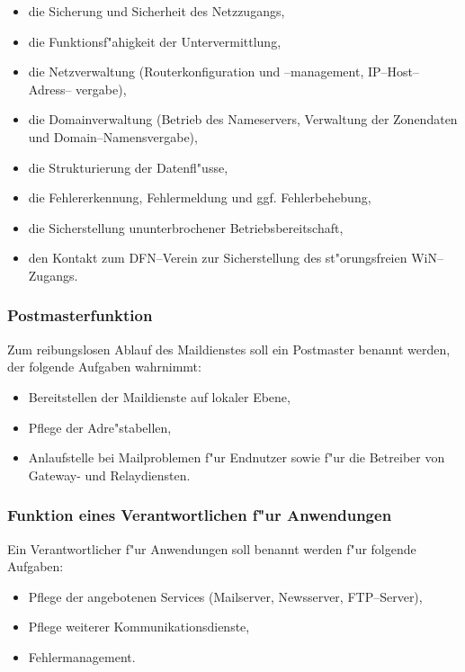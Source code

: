 \documentclass[12pt,titlepage,twoside]{scrartcl}
\begin{document}
\begin{appendix}
\begin{itemize}
  \item die Sicherung und Sicherheit des Netzzugangs,
  \item die Funktionsf"ahigkeit der Untervermittlung,
  \item die Netzverwaltung (Routerkonfiguration und --management,
    IP--Host--Adress-- vergabe),
  \item die Domainverwaltung (Betrieb des Nameservers, Verwaltung der
    Zonendaten und Domain--Namensvergabe),
  \item die Strukturierung der Datenfl"usse,
  \item die Fehlererkennung, Fehlermeldung und ggf. Fehlerbehebung,
  \item die Sicherstellung ununterbrochener Betriebsbereitschaft,
  \item den Kontakt zum DFN--Verein zur Sicherstellung des st"orungsfreien
    WiN--Zugangs.
\end{itemize}

\subsubsection{Postmasterfunktion}

Zum reibungslosen Ablauf des Maildienstes soll ein Postmaster benannt
werden, der folgende Aufgaben wahrnimmt:

\begin{itemize}
  \item Bereitstellen der Maildienste auf lokaler Ebene,
  \item Pflege der Adre"stabellen,
  \item Anlaufstelle bei Mailproblemen f"ur Endnutzer sowie f"ur die Betreiber
    von Gateway- und Relaydiensten.
\end{itemize}

\subsubsection{Funktion eines Verantwortlichen f"ur Anwendungen}

Ein Verantwortlicher f"ur Anwendungen soll benannt werden f"ur folgende
Aufgaben:

\begin{itemize}
  \item Pflege der angebotenen Services (Mailserver, Newsserver, FTP--Server),
  \item Pflege weiterer Kommunikationsdienste,
  \item Fehlermanagement.
\end{itemize}


\end{appendix}
\end{document}
